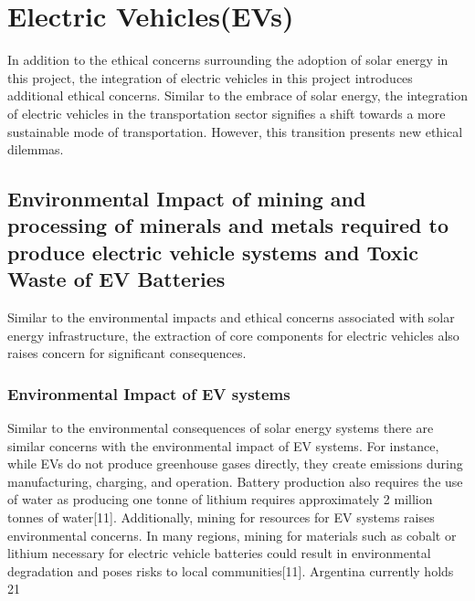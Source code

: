\documentclass[10pt,twocolumn]{article}
\begin{document}
\section{Electric Vehicles(EVs)}
In addition to the ethical concerns surrounding the adoption of solar energy in this project, the integration of electric vehicles in this project introduces additional ethical concerns. Similar to the embrace of solar energy, the integration of electric vehicles in the transportation sector signifies a shift towards a more sustainable mode of transportation. However, this transition presents new ethical dilemmas.   
\subsection{Environmental Impact of mining and processing of minerals and metals required to produce electric vehicle systems and Toxic Waste of EV Batteries }
Similar to the environmental impacts and ethical concerns associated with solar energy infrastructure, the extraction of core components for electric vehicles also raises concern for significant consequences.

\subsubsection{Environmental Impact of EV systems}
Similar to the environmental consequences of solar energy systems there are similar concerns with the environmental impact of EV systems. For instance, while EVs do not produce greenhouse gases directly, they create emissions during manufacturing, charging, and operation. Battery production also requires the use of water as producing one tonne of lithium requires approximately 2 million tonnes of water[11]. Additionally, mining for resources for EV systems raises environmental concerns. In many regions, mining for materials such as cobalt or lithium necessary for electric vehicle batteries could result in environmental degradation and poses risks to local communities[11]. Argentina currently holds 21%
\end{document}
